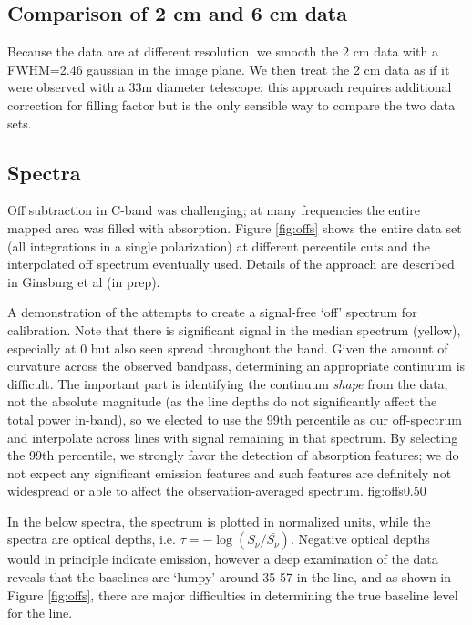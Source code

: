 \subsection{Comparison of 2 cm and 6 cm data}
Because the data are at different resolution, we smooth the 2 cm data with a
FWHM=2.46 \arcmin gaussian in the image plane.  We then treat the 2 cm data as
if it were observed with a 33m diameter telescope; this approach requires
additional correction for filling factor but is the only sensible way to
compare the two data sets.

\subsection{Spectra}
\label{sec:Spectra}

Off subtraction in C-band was challenging; at many frequencies the entire
mapped area was filled with \formaldehyde \oneone absorption.  Figure
\ref{fig:offs} shows the entire data set (all integrations in a single
polarization) at different percentile cuts and the interpolated off spectrum
eventually used.  Details of the approach are described in Ginsburg et al (in prep).


{A demonstration of the attempts to create a signal-free `off' spectrum for
calibration.  Note that there is significant signal in the median spectrum
(yellow), especially at 0 \kms but also seen spread throughout the band.  Given
the amount of curvature across the observed bandpass, determining an
appropriate continuum is difficult.  The important part is identifying the
continuum \emph{shape} from the data, not the absolute magnitude (as the line
depths do not significantly affect the total power in-band), so we elected to
use the 99th percentile as our off-spectrum and interpolate across lines with
signal remaining in that spectrum.  By selecting the 99th percentile, we
strongly favor the detection of absorption features; we do not expect any
significant emission features and such features are definitely not widespread
or able to affect the observation-averaged spectrum.}
{fig:offs}{0.5}{0}

In the below spectra, the \ammonia spectrum is plotted in normalized units,
while the \formaldehyde spectra are optical depths, i.e.
$\tau=-\log(S_\nu/\bar{S_\nu})$.  Negative optical depths would in principle
indicate emission, however a deep examination of the data reveals that the
baselines are `lumpy' around 35-57 \kms in the \twotwo line, and as shown in
Figure \ref{fig:offs}, there are major difficulties in determining the true
baseline level for the \oneone line.

